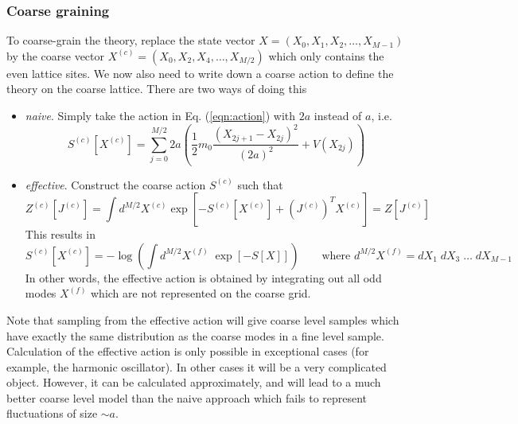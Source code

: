 \documentclass[11pt]{article}
\renewcommand{\vec}[1]{{#1}}
\begin{document}
\subsubsection{Coarse graining}
To coarse-grain the theory, replace the state vector $\vec{X}=(X_0,X_1,X_2,\dots,X_{M-1})$ by the coarse vector $\vec{X}^{(c)}=(X_0,X_2,X_4,\dots,X_{M/2})$ which only contains the even lattice sites. We now also need to write down a coarse action to define the theory on the coarse lattice. There are two ways of doing this
\begin{itemize}
\item \textit{naive}. Simply take the action in Eq. (\ref{eqn:action}) with $2a$ instead of $a$, i.e.
  \begin{equation}
    S^{(c)}[\vec{X}^{(c)}] = \sum_{j=0}^{M/2} 2a \left(\frac{1}{2}m_0\frac{(X_{2j+1}-X_{2j})^2}{(2a)^2}+V(X_{2j})\right)
    \end{equation}
\item \textit{effective}. Construct the coarse action $S^{(c)}$ such that
  \begin{equation}
    Z^{(c)}[\vec{J}^{(c)}] = \int d^{M/2}\vec{X}^{(c)} \exp\left[-S^{(c)}[\vec{X}^{(c)}]+(\vec{J}^{(c)})^T\vec{X}^{(c)}\right] = Z[\vec{J}^{(c)}]
  \end{equation}
  This results in
  \begin{equation}
    S^{(c)}[\vec{X}^{(c)}] = -\log \left(\int d^{M/2}\vec{X}^{(f)}\; \exp\left[-S[\vec{X}]\right]\right)\qquad\text{where $d^{M/2}\vec{X}^{(f)}=dX_1\;dX_3\;\dots\;dX_{M-1}$}
  \end{equation}
  In other words, the effective action is obtained by integrating out all odd modes $X^{(f)}$ which are not represented on the coarse grid.
\end{itemize}
Note that sampling from the effective action will give coarse level samples which have exactly the same distribution as the coarse modes in a fine level sample.
Calculation of the effective action is only possible in exceptional cases (for example, the harmonic oscillator). In other cases it will be a very complicated object. However, it can be calculated approximately, and will lead to a much better coarse level model than the naive approach which fails to represent fluctuations of size $\sim a$.
\end{document}
